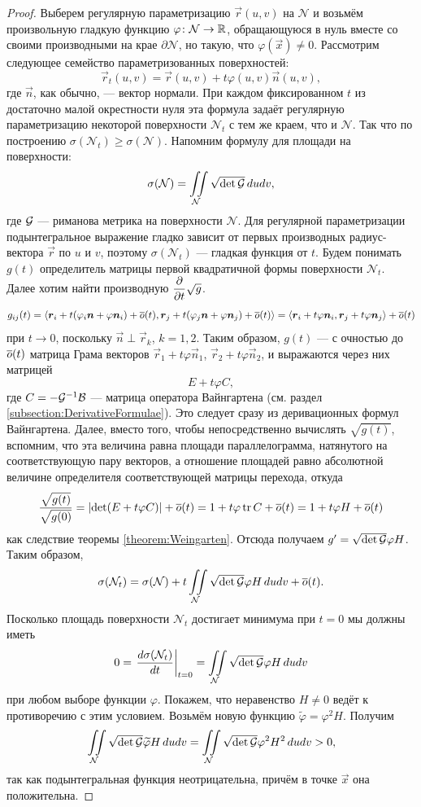 \begin{proof}
	Выберем регулярную параметризацию $\vec{r}(u, v)$ на $\mathcal{N}$ и возьмём произвольную гладкую функцию $\varphi\colon \mathcal{N} \to \mathbb{R}$, обращающуюся в нуль вместе со своими производными на крае $\partial\mathcal{N}$, но такую, что $\varphi(\vec{x}) \ne 0$. Рассмотрим следующее семейство параметризованных поверхностей:
	\[
		\vec{r}_t(u, v) = \vec{r}(u, v) + t\varphi(u, v)\vec{n}(u, v),
	\]
	где $\vec{n}$, как обычно, --- вектор нормали. При каждом фиксированном $t$ из достаточно малой окрестности нуля эта формула задаёт регулярную параметризацию некоторой поверхности $\mathcal{N}_t$ с тем же краем, что и $\mathcal{N}$. Так что по построению $\sigma(\mathcal{N}_t) \geqslant \sigma(\mathcal{N})$. Напомним формулу для площади на поверхности:
	\[
		\sigma(\mathcal{N}) = \iint\limits_{\mathcal{N}}\sqrt{\det\mathcal{G}}\,dudv,
	\]
	где $\mathcal{G}$ --- риманова метрика на поверхности $\mathcal{N}$. Для регулярной параметризации подынтегральное выражение гладко зависит от первых производных радиус-вектора $\vec{r}$ по $u$ и $v$, поэтому $\sigma(\mathcal{N}_t)$ --- гладкая функция от $t$. Будем понимать $g(t)$ определитель матрицы первой квадратичной формы поверхности $\mathcal{N}_t$. Далее хотим найти производную $\displaystyle\frac{\partial}{\partial t}\sqrt{g}$.
	\[
		g_{ij}(t) = \langle\boldsymbol{r}_i + t(\varphi_i\boldsymbol{n} + \varphi\boldsymbol{n}_i) + \overline{o}(t), \boldsymbol{r}_j + t(\varphi_j\boldsymbol{n} + \varphi\boldsymbol{n}_j) + \overline{o}(t)\rangle = \langle\boldsymbol{r}_i + t\varphi\boldsymbol{n}_i, \boldsymbol{r}_j + t\varphi\boldsymbol{n}_j\rangle + \overline{o}(t)
	\]
	при $t \to 0$, поскольку $\vec{n} \perp \vec{r}_k$, $k = 1, 2$. Таким образом, $g(t)$ --- с очностью до $\overline{o}(t)$ матрица Грама векторов $\vec{r}_1 + t\varphi\vec{n}_1$, $\vec{r}_2 + t\varphi\vec{n}_2$, и выражаются через них матрицей
	\[
		E + t\varphi C,
	\]
	где $C = -\mathcal{G}^{-1}\mathcal{B}$ --- матрица оператора Вайнгартена (см. раздел \ref{subsection:DerivativeFormulae}). Это следует сразу из деривационных формул Вайнгартена. Далее, вместо того, чтобы непосредственно вычислять $\sqrt{g(t)}$, вспомним, что эта величина равна площади параллелограмма, натянутого на соответствующую пару векторов, а отношение площадей равно абсолютной величине определителя соответствующей матрицы перехода, откуда
	\[
		\frac{\sqrt{g(t)}}{\sqrt{g(0)}} = \left\lvert\det(E + t\varphi C)\right\rvert + \overline{o}(t) = 1 + t\varphi\operatorname{tr} C + \overline{o}(t) = 1 + t\varphi H + \overline{o}(t)
	\]
	как следствие теоремы \ref{theorem:Weingarten}. Отсюда получаем $g^\prime = \sqrt{\det \mathcal{G}}\varphi H$. Таким образом,
	\[
		\sigma(\mathcal{N}_t) = \sigma(\mathcal{N}) + t\iint\limits_{\mathcal{N}}\sqrt{\det \mathcal{G}}\varphi H\,dudv + \overline{o}(t).
	\]
	Посколько площадь поверхности $\mathcal{N}_t$ достигает минимума при $t = 0$ мы должны иметь
	\[
		0 = \left.\frac{d\sigma(\mathcal{N}_t)}{dt}\right|_{t = 0} = \iint\limits_{\mathcal{N}}\sqrt{\det \mathcal{G}}\varphi H\,dudv
	\]
	при любом выборе функции $\varphi$. Покажем, что неравенство $H \ne 0$ ведёт к противоречию с этим условием. Возьмём новую функцию $\widetilde{\varphi} = \varphi^2H$. Получим
	\[
		\iint\limits_{\mathcal{N}}\sqrt{\det \mathcal{G}}\widetilde{\varphi}H\,dudv = \iint\limits_{\mathcal{N}}\sqrt{\det\mathcal{G}}\varphi^2H^2\,dudv > 0,
	\]
	так как подынтегральная функция неотрицательна, причём в точке $\vec{x}$ она положительна.
\end{proof}

